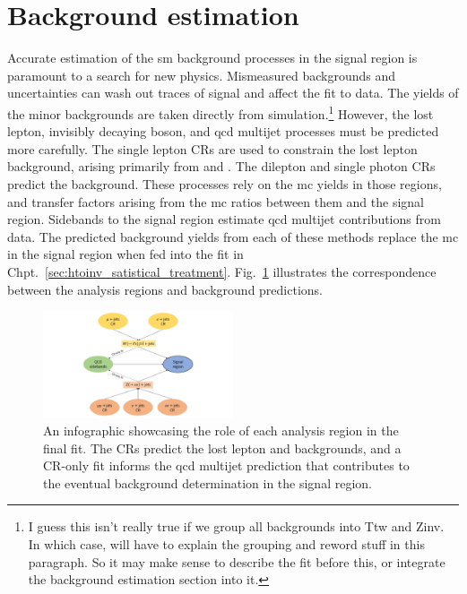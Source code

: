 \section{Background estimation}
\label{sec:htoinv_background_est}


Accurate estimation of the \acrlong{sm} background processes in the signal region is paramount to a search for new physics. Mismeasured backgrounds and uncertainties can wash out traces of signal and affect the fit to data. The yields of the minor backgrounds are taken directly from simulation.\footnote{I guess this isn't really true if we group all backgrounds into Ttw and Zinv. In which case, will have to explain the grouping and reword stuff in this paragraph. So it may make sense to describe the fit before this, or integrate the background estimation section into it.} However, the lost lepton, invisibly decaying \PZ boson, and \acrshort{qcd} multijet processes must be predicted more carefully. The single lepton \glspl{CR} are used to constrain the lost lepton background, arising primarily from \ttbarpjets and \wtolnupjets. The dilepton and single photon \glspl{CR} predict the \ztonunupjets background. These processes rely on the \acrlong{mc} yields in those regions, and transfer factors arising from the \acrshort{mc} ratios between them and the signal region. Sidebands to the signal region estimate \acrshort{qcd} multijet contributions from data. The predicted background yields from each of these methods replace the \acrlong{mc} in the signal region when fed into the fit in Chpt.~\ref{sec:htoinv_satistical_treatment}. Fig.~\ref{fig:htoinv_fit_overview} illustrates the correspondence between the analysis regions and background predictions.

\begin{figure}[htbp]
    \centering
    \includegraphics[width=0.5\textwidth]{figures/fit_overview.pdf}
    \caption[An infographic showcasing the role of each analysis region in the final fit]{An infographic showcasing the role of each analysis region in the final fit. The \glspl{CR} predict the lost lepton and \ztonunu backgrounds, and a \gls{CR}-only fit informs the \acrshort{qcd} multijet prediction that contributes to the eventual background determination in the signal region.}
    \label{fig:htoinv_fit_overview}
\end{figure}


